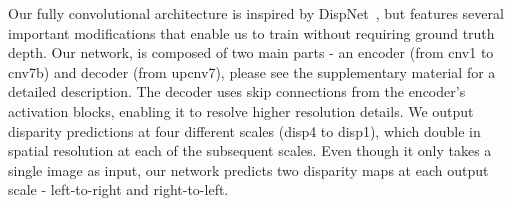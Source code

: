 \documentclass[10pt,twocolumn,letterpaper]{article}
\begin{document}
Our fully convolutional architecture is inspired by DispNet~\cite{mayer2015large}, but features several important modifications that enable us to train without requiring ground truth depth. 
Our network, is composed of two main parts - an encoder (from cnv1 to cnv7b) and decoder (from upcnv7), please see the supplementary material for a detailed description.
The decoder uses skip connections \cite{shelhamer2016fully} from the encoder's activation blocks, enabling it to resolve higher resolution details. 
We output disparity predictions at four different scales (disp4 to disp1), which double in spatial resolution at each of the subsequent scales. 
Even though it only takes a single image as input, our network predicts two disparity maps at each output scale - left-to-right and right-to-left.

\begin{table*}[!h]
  \centering
\end{table*}
\end{document}
